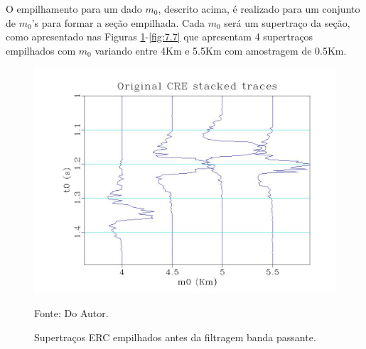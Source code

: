
O empilhamento para um dado $m_0$, descrito acima, é realizado para um conjunto de $m_0$'s para formar a seção empilhada.
Cada $m_0$ será um supertraço da seção, como apresentado nas Figuras \ref{fig:7.6}-\ref{fig:7.7} 
que apresentam 4 supertraços empilhados
com $m_0$ variando entre 4Km e 5.5Km com amostragem de 0.5Km.

\begin{figure}
\caption{Supertraços ERC empilhados antes da filtragem banda passante.}
\begin{center}
\includegraphics[scale=0.4]{images/stackedTraces.jpeg}
\vspace{-0.3cm}
\end{center}
\begin{center}
 Fonte: Do Autor.
\end{center}
\label{fig:7.6}
\end{figure}

